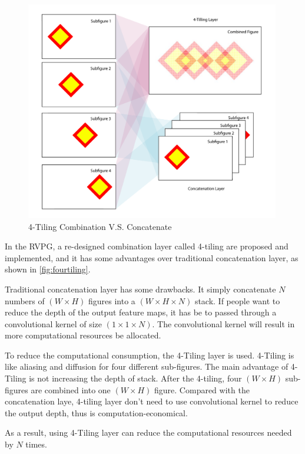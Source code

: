 \begin{spacing}{1.5}
\begin{figure}[ht]
\centering
\includegraphics[width=0.99\textwidth, fbox]{Chapter3/fourtiling.pdf}
\caption{4-Tiling Combination V.S. Concatenate}
\label{fig:fourtiling} 
\end{figure}

In the RVPG, a re-designed combination layer called 4-tiling are proposed and implemented, and it has some advantages over traditional concatenation layer, as shown in \autoref{fig:fourtiling}.

Traditional concatenation layer has some drawbacks. It simply concatenate $N$ numbers of $(W \times H)$ figures into a $(W \times H \times N)$ stack. If people want to reduce the depth of the output feature maps, it has be to passed through a convolutional kernel of size $(1 \times 1 \times N)$. The convolutional kernel will result in more computational resources be allocated.

To reduce the computational consumption, the 4-Tiling layer is used. 4-Tiling is like aliasing and diffusion for four different sub-figures. The main advantage of 4-Tiling is not increasing the depth of stack. After the 4-tiling, four $(W \times H)$ sub-figures are combined into one $(W \times H)$ figure. Compared with the concatenation laye, 4-tiling layer don't need to use convolutional kernel to reduce the output depth, thus is computation-economical.

As a result, using 4-Tiling layer can reduce the computational resources needed by $N$ times.


\end{spacing}
